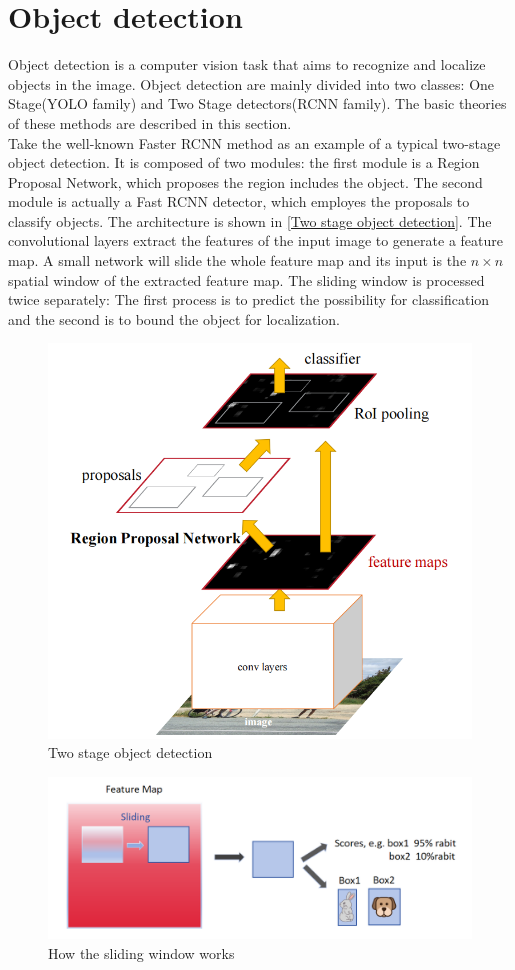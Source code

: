 \section{Object detection}
  Object detection is a computer vision task that aims to recognize and localize objects in the image. Object detection are mainly divided into two classes: 
  One Stage(YOLO family) and Two Stage detectors(RCNN family). The basic theories of these methods are described in this section.\\
  Take the well-known Faster RCNN method as an example of a typical two-stage object detection\cite{NIPS2015_14bfa6bb}. It is composed of two modules: the 
  first module is a Region Proposal Network, which proposes the region includes the object. The second module is actually a Fast RCNN detector, which employes
  the proposals to classify objects. The architecture is shown in \autoref{Two stage object detection}. The convolutional layers extract the features of the 
  input image to generate a feature map. A small network will slide the whole feature map and its input is the $n \times n$ spatial window of the extracted feature map.
  The sliding window is processed twice separately: The first process is to predict the possibility for classification and the second is to bound the object for localization.\\
  \begin{figure}[!htbp]
    \centering
    \includegraphics[width=0.6\linewidth]{example_images/two_stage_detection}
    \caption{Two stage object detection\cite{NIPS2015_14bfa6bb}}
    \label{Two stage object detection}
  \end{figure}
  \begin{figure}[!htbp]
    \centering
    \includegraphics[width=0.9\linewidth]{example_images/Region Proposal}
    \caption{How the sliding window works}
    \label{How the sliding window works}
  \end{figure}
